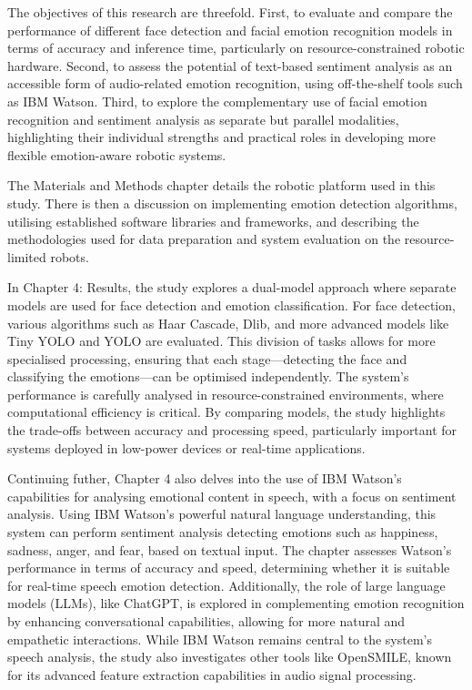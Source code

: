 The objectives of this research are threefold. First, to evaluate and compare the performance of different face detection and facial emotion recognition models in terms of accuracy and inference time, particularly on resource-constrained robotic hardware. Second, to assess the potential of text-based sentiment analysis as an accessible form of audio-related emotion recognition, using off-the-shelf tools such as IBM Watson. Third, to explore the complementary use of facial emotion recognition and sentiment analysis as separate but parallel modalities, highlighting their individual strengths and practical roles in developing more flexible emotion-aware robotic systems.

The Materials and Methods chapter details the robotic platform used in this study. There is then a discussion on implementing emotion detection algorithms, utilising established software libraries and frameworks, and describing the methodologies used for data preparation and system evaluation on the resource-limited robots.

In Chapter 4: Results, the study explores a dual-model approach where separate models are used for face detection and emotion classification. For face detection, various algorithms such as Haar Cascade, Dlib, and more advanced models like Tiny YOLO and YOLO are evaluated. This division of tasks allows for more specialised processing, ensuring that each stage—detecting the face and classifying the emotions—can be optimised independently. The system's performance is carefully analysed in resource-constrained environments, where computational efficiency is critical. By comparing models, the study highlights the trade-offs between accuracy and processing speed, particularly important for systems deployed in low-power devices or real-time applications. 

Continuing futher, Chapter 4 also delves into the use of IBM Watson's capabilities for analysing emotional content in speech, with a focus on sentiment analysis. Using IBM Watson's powerful natural language understanding, this system can perform sentiment analysis detecting emotions such as happiness, sadness, anger, and fear, based on textual input. The chapter assesses Watson's performance in terms of accuracy and speed, determining whether it is suitable for real-time speech emotion detection. Additionally, the role of large language models (LLMs), like ChatGPT, is explored in complementing emotion recognition by enhancing conversational capabilities, allowing for more natural and empathetic interactions. While IBM Watson remains central to the system's speech analysis, the study also investigates other tools like OpenSMILE, known for its advanced feature extraction capabilities in audio signal processing.

